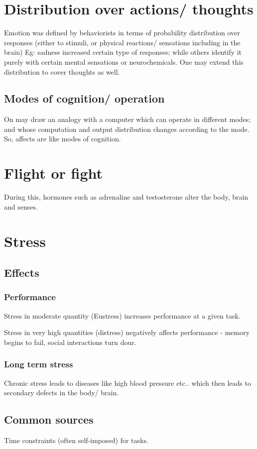 \documentclass[oneside, article]{memoir}
\begin{document}
\section{Distribution over actions/ thoughts}
Emotion was defined by behaviorists in terms of probability distribution over responses (either to stimuli, or physical reactions/ sensations including in the brain) Eg: sadness increased certain type of responses; while others identify it purely with certain mental sensations or neurochemicals. One may extend this distribution to cover thoughts as well.

\subsection{Modes of cognition/ operation}
On may draw an analogy with a computer which can operate in different modes; and whose computation and output distribution changes according to the mode. So, affects are like modes of cognition.

\section{Flight or fight}
During this, hormones such as adrenaline and testosterone alter the body, brain and senses.

\section{Stress}
\subsection{Effects}
\subsubsection{Performance}
Stress in moderate quantity (Eustress) increases performance at a given task.

Stress in very high quantities (distress) negatively affects performance - memory begins to fail, social interactions turn dour.

\subsubsection{Long term stress}
Chronic stress leads to diseases like high blood pressure etc.. which then leads to secondary defects in the body/ brain.

\subsection{Common sources}
Time constraints (often self-imposed) for tasks.
\end{document}
